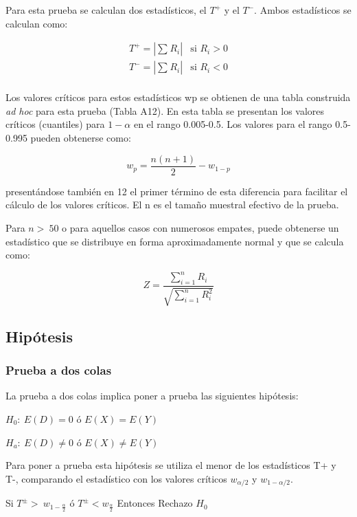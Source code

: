 \documentclass[]{book}
\theoremstyle{definition}
\theoremstyle{definition}
\theoremstyle{definition}
\theoremstyle{remark}
\begin{document}
Para esta prueba se calculan dos estadísticos, el \(T^{+}\) y el
\(T^{-}\). Ambos estadísticos se calculan como:

\[
\begin{matrix}
T^{+} = \left| \sum_{}^{}R_{i} \right| & \text{si }R_{i} > 0 \\
T^{-} = \left| \sum_{}^{}R_{i} \right| & \text{si }R_{i} < 0 \\
\end{matrix}
\]

Los valores críticos para estos estadísticos wp se obtienen de una tabla
construida \emph{ad hoc} para esta prueba (Tabla A12). En esta tabla se
presentan los valores críticos (cuantiles) para \(1 - \alpha\) en el
rango 0.005-0.5. Los valores para el rango 0.5-0.995 pueden obtenerse
como:

\[
w_{p} = \frac{n\left( n + 1 \right)}{2} - w_{1 - p}
\]

presentándose también en 12 el primer término de esta diferencia para
facilitar el cálculo de los valores críticos. El n es el tamaño muestral
efectivo de la prueba.

Para \(n > \ 50\) o para aquellos casos con numerosos empates, puede
obtenerse un estadístico que se distribuye en forma aproximadamente
normal y que se calcula como:

\[
Z = \frac{\sum_{i = 1}^{n}R_{i}}{\sqrt{\sum_{i = 1}^{n}R_{i}^{2}}}
\]

\hypertarget{hipotesis-1}{%
\subsection{Hipótesis}\label{hipotesis-1}}

\hypertarget{prueba-a-dos-colas-1}{%
\subsubsection{Prueba a dos colas}\label{prueba-a-dos-colas-1}}

La prueba a dos colas implica poner a prueba las siguientes hipótesis:

\(H_{0}:\ E(D) = 0\) ó \(E(X) = E(Y)\)

\(H_{a}:\ E\left( D \right) \neq 0\) ó \(E\left( X \right) \neq E(Y)\)

Para poner a prueba esta hipótesis se utiliza el menor de los
estadísticos T+ y T-, comparando el estadístico con los valores críticos
\(w_{\alpha/2}\) y \(w_{1 - \alpha/2}\).

Si \(T^{\pm} > \ w_{1 - \frac{\alpha}{2}}\) ó
\(T^{\pm} <w_{\frac{\alpha}{2}}\) Entonces Rechazo \(H_{0}\)
\end{document}
